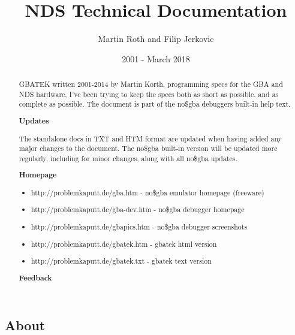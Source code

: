\documentclass[11pt,a4paper]{proc}
\begin{document}
\obeylines

\title{NDS Technical Documentation}
\author{Martin Roth and Filip Jerkovic}
\date{2001 - March 2018}

\maketitle

\newpage

\setcounter{tocdepth}{5}
\setcounter{secnumdepth}{50}
\tableofcontents

\newpage

\obeyspaces

\renewcommand{\abstractname}{About this Documentation}

\begin{flushleft}

\section*{About}

\begin{abstract}

GBATEK written 2001-2014 by Martin Korth, programming specs for the GBA and NDS hardware, I've been trying to keep the specs both as short as possible, and as complete as possible. The document is part of the no\$gba debuggers built-in help text.

\textbf{Updates}

The standalone docs in TXT and HTM format are updated when having added any major changes to the document. The no\$gba built-in version will be updated more regularly, including for minor changes, along with all no\$gba updates.

\textbf{Homepage}

\begin{itemize}
\item http://problemkaputt.de/gba.htm - no\$gba emulator homepage (freeware)
\item http://problemkaputt.de/gba-dev.htm - no\$gba debugger homepage
\item http://problemkaputt.de/gbapics.htm - no\$gba debugger screenshots
\item http://problemkaputt.de/gbatek.htm - gbatek html version
\item http://problemkaputt.de/gbatek.txt - gbatek text version
\end{itemize}

\textbf{Feedback}


\end{abstract}
\end{flushleft}
\end{document}

